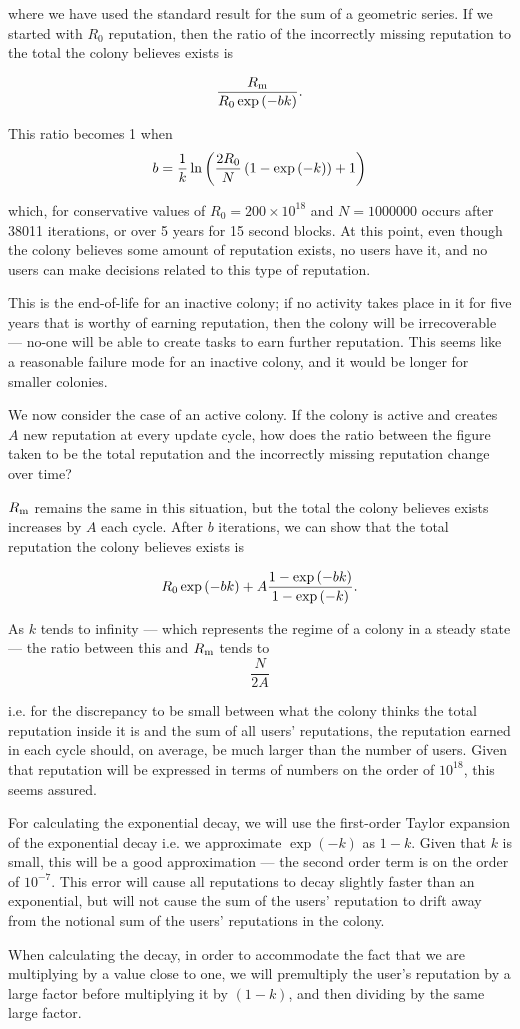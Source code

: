 \noindent where we have used the standard result for the sum of a geometric series. If we started with $R_0$ reputation, then the ratio of the incorrectly missing reputation to the total the colony believes exists is

$$\frac{R_{\rm m}}{R_0\exp\left(-bk\right)}.$$


This ratio becomes 1 when
$$ b = \frac{1}{k}\ln\left(\frac{2R_{\rm 0}}{N}\left(1-\exp\left(-k\right)\right) +1   \right)$$


\noindent which, for conservative values of $R_0 = 200\times10^{18}$ and $N=1000000$ occurs after 38011 iterations, or over 5 years for 15 second blocks. At this point, even though the colony believes some amount of reputation exists, no users have it, and no users can make decisions related to this type of reputation.

This is the end-of-life for an inactive colony; if no activity takes place in it for five years that is worthy of earning reputation, then the colony will be irrecoverable --- no-one will be able to create tasks to earn further reputation. This seems like a reasonable failure mode for an inactive colony, and it would be longer for smaller colonies. 

We now consider the case of an active colony. If the colony is active and creates $A$ new reputation at every update cycle, how does the ratio between the figure taken to be the total reputation and the incorrectly missing reputation change over time?

$R_{\rm m}$ remains the same in this situation, but the total the colony believes exists increases by $A$ each cycle. After $b$ iterations, we can show that the total reputation the colony believes exists is

$$R_{\rm 0}\exp\left(-bk\right) + A\frac{1-\exp\left(-bk\right)}{1-\exp\left(-k\right)}.$$


As $k$ tends to infinity --- which represents the regime of a colony in a steady state --- the ratio between this and $R_{\rm m}$ tends to 
$$\frac{N}{2A}$$

\noindent i.e. for the discrepancy to be small between what the colony thinks the total reputation inside it is and the sum of all users' reputations, the reputation earned in each cycle should, on average, be much larger than the number of users. Given that reputation will be expressed in terms of numbers on the order of $10^{18}$, this seems assured.

For calculating the exponential decay, we will use the first-order Taylor expansion of the exponential decay i.e. we approximate $\exp\left(-k\right)$ as $1-k$. Given that $k$ is small, this will be a good approximation --- the second order term is on the order of $10^{-7}$. This error will cause all reputations to decay slightly faster than an exponential, but will not cause the sum of the users' reputation to drift away from the notional sum of the users' reputations in the colony.

When calculating the decay, in order to accommodate the fact that we are multiplying by a value close to one, we will premultiply the user's reputation by a large factor before multiplying it by $(1-k)$, and then dividing by the same large factor.